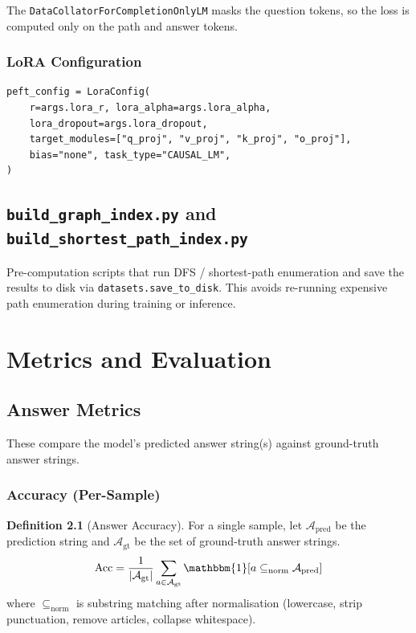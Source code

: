 \documentclass[11pt,a4paper,oneside,openany]{book}
\theoremstyle{definition}
\newtheorem{definition}{Definition}[chapter]
\newcommand{\code}[1]{\texttt{#1}}
\begin{document}
The \code{DataCollatorForCompletionOnlyLM} masks the question tokens, so the loss is computed only on the path and answer tokens.

\subsection{LoRA Configuration}

\begin{lstlisting}
peft_config = LoraConfig(
    r=args.lora_r, lora_alpha=args.lora_alpha,
    lora_dropout=args.lora_dropout,
    target_modules=["q_proj", "v_proj", "k_proj", "o_proj"],
    bias="none", task_type="CAUSAL_LM",
)
\end{lstlisting}

\section{\texttt{build\_graph\_index.py} and \texttt{build\_shortest\_path\_index.py}}

Pre-computation scripts that run DFS / shortest-path enumeration and save the results to disk via \code{datasets.save\_to\_disk}. This avoids re-running expensive path enumeration during training or inference.

\chapter{Metrics and Evaluation}\label{ch:metrics}

\section{Answer Metrics}

These compare the model's predicted answer string(s) against ground-truth answer strings.

\subsection{Accuracy (Per-Sample)}

\begin{definition}[Answer Accuracy]
	For a single sample, let $\mathcal{A}_{\text{pred}}$ be the prediction string and $\mathcal{A}_{\text{gt}}$ be the set of ground-truth answer strings.
	$$\text{Acc} = \frac{1}{|\mathcal{A}_{\text{gt}}|} \sum_{a \in \mathcal{A}_{\text{gt}}} \mathbbm{1}[a \subseteq_{\text{norm}} \mathcal{A}_{\text{pred}}]$$
	where $\subseteq_{\text{norm}}$ is substring matching after normalisation (lowercase, strip punctuation, remove articles, collapse whitespace).
\end{definition}
\end{document}
